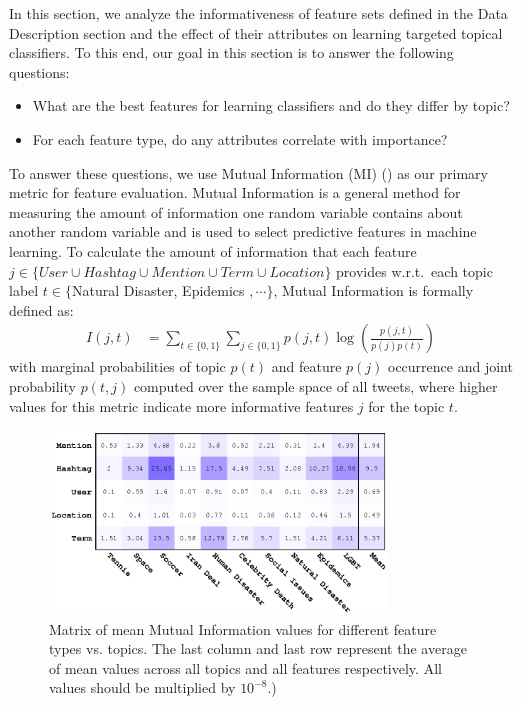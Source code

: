 In this section, we analyze the informativeness of feature sets defined in the Data Description section and the effect of their
attributes on learning targeted topical classifiers. To this end,
our goal in this section is to answer the following questions:
\begin{itemize}
\item What are the best features for learning classifiers and do they differ by topic?
\item For each feature type, do any attributes correlate with importance?
\end{itemize}

To answer these questions, we use Mutual Information (MI) (\cite{manning_ir}) as our primary
metric for feature evaluation.  Mutual Information is a general method
for measuring the amount of information one random variable contains
about another random variable and is used to select
predictive features in machine learning.  To calculate the amount of
information that each feature
$j \in \{ \textit{User} \cup \textit{Hashtag} \cup \textit{Mention} \cup \textit{Term} \cup \textit{Location} \}$
provides w.r.t.\ each topic label $t \in \{$Natural Disaster, Epidemics $,\cdots\}$,
Mutual Information is formally defined as:
\begin{align*}
I(j, t) & = \!\!\! \sum_{t \in \{ \mathrm{0}, \mathrm{1} \}} \sum_{j \in \{ \mathrm{0}, \mathrm{1}\}}p(j,t)\log \left ( \frac{p(j,t)}{p(j)p(t)} \right ) 
 \label{eq:eq1}
\end{align*}
with marginal probabilities of topic $p(t)$ and feature $p(j)$ occurrence and joint probability $p(t,j)$ computed over the sample space of all tweets, 
where higher values for this metric indicate more informative features $j$ for the topic $t$.




\begin{figure}[t!]
\centering
\includegraphics[width=0.8\textwidth]{images/avgMI_gray}
\caption{Matrix of mean Mutual Information values for different feature types vs. topics.  The last column and last row represent the average of mean values across all topics and all features respectively.  All values should be multiplied by $10^{-8}$.)}
\label{fig:avgMI}
\end{figure}

